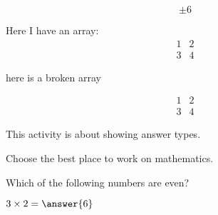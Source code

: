 \documentclass{ximera}
\begin{document}
\begin{onlineOnly}
  \begin{center}    
  \end{center}
\end{onlineOnly}


\begin{onlineOnly}
  \begin{center}    
  \end{center}
\end{onlineOnly}


\begin{onlineOnly}
  \begin{center}    
  \end{center}
\end{onlineOnly}








\[
\pm 6
\]

Here I have an array:
\[
\begin{array}{|c|c|}
  1 & 2 \\
  3 & 4
\end{array}
\]

here is a broken array

\[
\begin{array}{|c|c|}
  1 & 2 \\
  
  3 & 4
\end{array}
\]


This activity is about showing answer types.
\begin{problem}  
  Choose the best place to work on mathematics.  
  \begin{multipleChoice}  
  \end{multipleChoice}
\end{problem}


\begin{problem}  
  Which of the following numbers are even?  
  \begin{selectAll}  
  \end{selectAll}  
\end{problem}


\begin{problem}  
  $3\times 2 = \answer{6}$  
\end{problem} 
\end{document}
